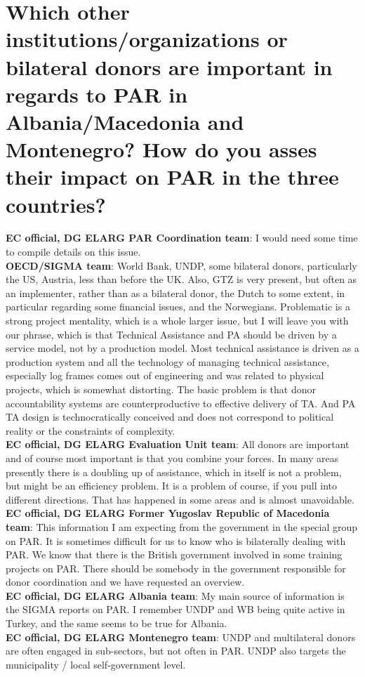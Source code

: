 \section{Which other institutions/organizations or bilateral donors are important in regards to PAR in Albania/Macedonia and Montenegro? How do you asses their impact on PAR in the three countries?}
\textbf{EC official, DG ELARG PAR Coordination team}: I would need some time to compile details on this issue. \\
\textbf{OECD/SIGMA team}: World Bank, UNDP, some bilateral donors, particularly the US, Austria, less than before the UK. Also, GTZ is very present, but often as an implementer, rather than as a bilateral donor, the Dutch to some extent, in particular regarding some financial issues, and the Norwegians. Problematic is a strong project mentality, which is a whole larger issue, but I will leave you with our phrase, which is that Technical Assistance and PA should be driven by a service model, not by a production model. Most technical assistance is driven as a production system and all the technology of managing technical assistance, especially log frames comes out of engineering and was related to physical projects, which is somewhat distorting. The basic problem is that donor accountability systems are counterproductive to effective delivery of TA. And PA TA design is technocratically conceived and does not correspond to political reality or the constraints of complexity.\\
\textbf{EC official, DG ELARG Evaluation Unit team}: All donors are important and of course most important is that you combine your forces. In many areas presently there is a doubling up of assistance, which in itself is not a problem, but might be an efficiency problem. It is a problem of course, if you pull into different directions. That has happened in some areas and is almost unavoidable. \\
\textbf{EC official, DG ELARG Former Yugoslav Republic of Macedonia team}: This information I am expecting from the government in the special group on PAR. It is sometimes difficult for us to know who is bilaterally dealing with PAR. We know that there is the British government involved in some training projects on PAR. There should be somebody in the government responsible for donor coordination and we have requested an overview. \\
\textbf{EC official, DG ELARG Albania team}: My main source of information is the SIGMA reports on PAR. I remember UNDP and WB being quite active in Turkey, and the same seems to be true for Albania.\\
\textbf{EC official, DG ELARG Montenegro team}: UNDP and multilateral donors are often engaged in sub-sectors, but not often in PAR. UNDP also targets the municipality / local self-government level.\\
